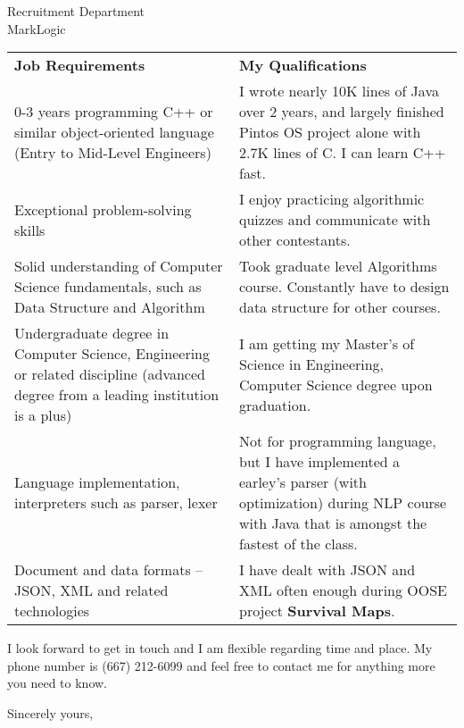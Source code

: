 \documentclass[11pt]{letter} %
\begin{document}
\begin{letter}{Recruitment Department \\
MarkLogic}
\begin{tabular}{p{0.5\linewidth} p{0.5\linewidth}}
\textbf{Job Requirements} & \textbf{My Qualifications} \\
0-3 years programming C++ or similar object-oriented language (Entry to Mid-Level Engineers) & I wrote nearly 10K lines of Java over 2 years, and largely finished Pintos OS project alone with 2.7K lines of C. I can learn C++ fast.\\
Exceptional problem-solving skills & I enjoy practicing algorithmic quizzes and communicate with other contestants. \\
Solid understanding of Computer Science fundamentals, such as Data Structure and Algorithm & Took graduate level Algorithms course. Constantly have to design data structure for other courses. \\
Undergraduate degree in Computer Science, Engineering or related discipline (advanced degree from a leading institution is a plus) & I am getting my Master's of Science in Engineering, Computer Science degree upon graduation. \\
Language implementation, interpreters such as parser, lexer & Not for programming language, but I have implemented a earley's parser (with optimization) during NLP course with Java that is amongst the fastest of the class. \\
Document and data formats – JSON, XML and related technologies & I have dealt with JSON and XML often enough during OOSE project \textbf{Survival Maps}.
\end{tabular}

I look forward to get in touch and I am flexible regarding time and place. My phone number is (667) 212-6099 and feel free to contact me for anything more you need to know.

\closing{Sincerely yours,}




\end{letter}
\end{document}
